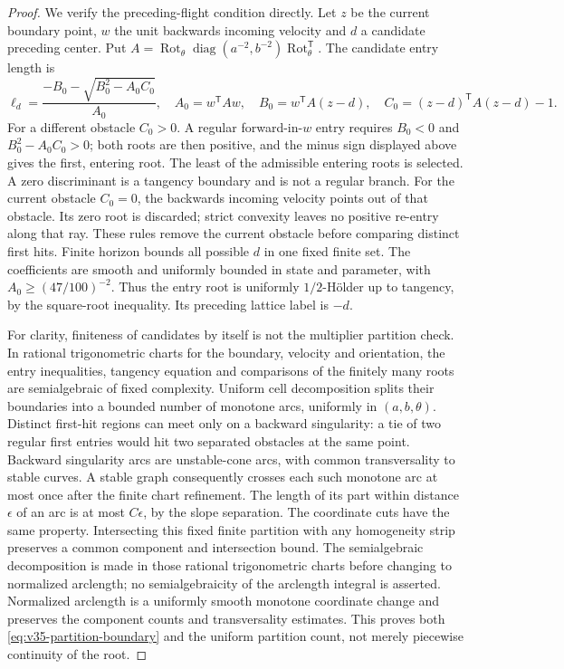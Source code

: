 \begin{proof}
We verify the preceding-flight condition directly. Let $z$ be the
current boundary point, $w$ the unit backwards incoming velocity and
$d$ a candidate preceding center. Put
$A=\operatorname{Rot}_\theta\operatorname{diag}(a^{-2},b^{-2})
\operatorname{Rot}_\theta^{\mathsf T}$. The candidate entry length is
\begin{equation}\label{eq:v35-ellipse-entry-root}
 \ell_d=\frac{-B_0-\sqrt{B_0^2-A_0C_0}}{A_0},\quad
 A_0=w^{\mathsf T}Aw,\quad B_0=w^{\mathsf T}A(z-d),\quad
 C_0=(z-d)^{\mathsf T}A(z-d)-1.
\end{equation}
For a different obstacle $C_0>0$. A regular forward-in-$w$ entry
requires $B_0<0$ and $B_0^2-A_0C_0>0$; both roots are then positive,
and the minus sign displayed above gives the first, entering root.
The least of the admissible entering roots is selected. A zero
discriminant is a tangency boundary and is not a regular branch.
For the current obstacle $C_0=0$, the backwards incoming velocity
points out of that obstacle. Its zero root is discarded; strict
convexity leaves no positive re-entry along that ray. These rules
remove the current obstacle before comparing distinct first hits. Finite horizon
bounds all possible $d$ in one fixed finite set. The coefficients are
smooth and uniformly bounded in state and parameter, with
$A_0\ge(47/100)^{-2}$. Thus the entry root is uniformly $1/2$-H\"older
up to tangency, by the square-root inequality. Its preceding lattice
label is $-d$.

For clarity, finiteness of candidates by itself is not the multiplier
partition check. In rational trigonometric charts for the boundary,
velocity and orientation, the entry inequalities, tangency equation
and comparisons of the finitely many roots are semialgebraic of fixed
complexity. Uniform cell decomposition splits their boundaries into
a bounded number of monotone arcs, uniformly in $(a,b,\theta)$.
Distinct first-hit regions can meet only on a backward singularity:
a tie of two regular first entries would hit two separated obstacles
at the same point. Backward singularity arcs are unstable-cone arcs,
with common transversality to stable curves. A stable graph consequently
crosses each such monotone arc at most once after the finite chart
refinement. The length of its part within distance $\epsilon$ of an
arc is at most $C\epsilon$, by the slope separation. The coordinate
cuts have the same property. Intersecting this fixed finite partition
with any homogeneity strip preserves a common component and
intersection bound. The semialgebraic decomposition is made in those rational
trigonometric charts before changing to normalized arclength; no
semialgebraicity of the arclength integral is asserted. Normalized
arclength is a uniformly smooth monotone coordinate change and
preserves the component counts and transversality estimates. This proves
both \eqref{eq:v35-partition-boundary} and the uniform partition count,
not merely piecewise continuity of the root.


\end{proof}

